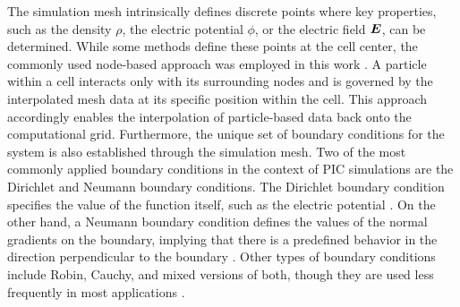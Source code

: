 The simulation mesh intrinsically defines discrete points where key properties, such as the density $\rho$, the electric potential $\phi$, or the electric field $\bm{E}$, can be determined. While some methods define these points at the cell center, the commonly used node-based approach was employed in this work \cite{brieda_plasma_2019}. A particle within a cell interacts only with its surrounding nodes and is governed by the interpolated mesh data at its specific position within the cell. This approach accordingly enables the interpolation of particle-based data back onto the computational grid. Furthermore, the unique set of boundary conditions for the system is also established through the simulation mesh. Two of the most commonly applied boundary conditions in the context of \acs{PIC} simulations are the Dirichlet and Neumann boundary conditions. The Dirichlet boundary condition specifies the value of the function itself, such as the electric potential \cite{press_numerical_2007}. On the other hand, a Neumann boundary condition defines the values of the normal gradients on the boundary, implying that there is a predefined behavior in the direction perpendicular to the boundary \cite{press_numerical_2007}. Other types of boundary conditions include Robin, Cauchy, and mixed versions of both, though they are used less frequently in most applications \cite{brieda_plasma_2019}.

